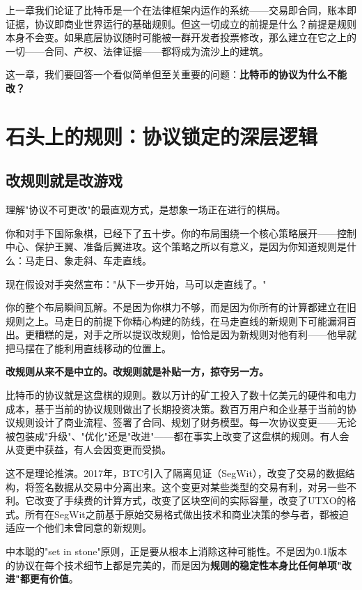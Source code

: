 \documentclass[a4paper,12pt,openany]{ctexbook}
\begin{document}
上一章我们论证了比特币是一个在法律框架内运作的系统——交易即合同，账本即证据，协议即商业世界运行的基础规则。但这一切成立的前提是什么？前提是规则本身不会变。如果底层协议随时可能被一群开发者投票修改，那么建立在它之上的一切——合同、产权、法律证据——都将成为流沙上的建筑。

这一章，我们要回答一个看似简单但至关重要的问题：\textbf{比特币的协议为什么不能改？}


\section*{石头上的规则：协议锁定的深层逻辑}



\subsection*{改规则就是改游戏}


理解"协议不可更改"的最直观方式，是想象一场正在进行的棋局。

你和对手下国际象棋，已经下了五十步。你的布局围绕一个核心策略展开——控制中心、保护王翼、准备后翼进攻。这个策略之所以有意义，是因为你知道规则是什么：马走日、象走斜、车走直线。

现在假设对手突然宣布："从下一步开始，马可以走直线了。"

你的整个布局瞬间瓦解。不是因为你棋力不够，而是因为你所有的计算都建立在旧规则之上。马走日的前提下你精心构建的防线，在马走直线的新规则下可能漏洞百出。更糟糕的是，对手之所以提议改规则，恰恰是因为新规则对他有利——他早就把马摆在了能利用直线移动的位置上。

\textbf{改规则从来不是中立的。改规则就是补贴一方，掠夺另一方。}

比特币的协议就是这盘棋的规则。数以万计的矿工投入了数十亿美元的硬件和电力成本，基于当前的协议规则做出了长期投资决策。数百万用户和企业基于当前的协议规则设计了商业流程、签署了合同、规划了财务模型。每一次协议变更——无论被包装成"升级"、"优化"还是"改进"——都在事实上改变了这盘棋的规则。有人会从变更中获益，有人会因变更而受损。

这不是理论推演。2017年，BTC引入了隔离见证（SegWit），改变了交易的数据结构，将签名数据从交易中分离出来。这个变更对某些类型的交易有利，对另一些不利。它改变了手续费的计算方式，改变了区块空间的实际容量，改变了UTXO的格式。所有在SegWit之前基于原始交易格式做出技术和商业决策的参与者，都被迫适应一个他们未曾同意的新规则。

中本聪的"set in stone"原则，正是要从根本上消除这种可能性。不是因为0.1版本的协议在每个技术细节上都是完美的，而是因为\textbf{规则的稳定性本身比任何单项"改进"都更有价值}。
\end{document}
